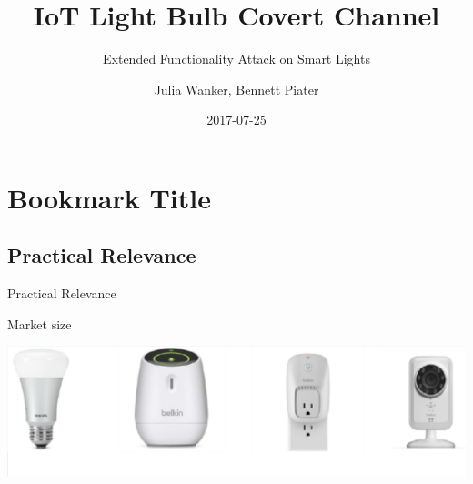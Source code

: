 \documentclass[11pt,t,usepdftitle=false,aspectratio=169]{beamer}
\title[IoT Light Bulb Attack]{IoT Light Bulb Covert Channel}
\subtitle{Extended Functionality Attack on Smart Lights}
\author[Julia Wanker \& Bennett Piater]{Julia Wanker, Bennett Piater}
\date{2017-07-25}
\begin{document}



\section{Bookmark Title}

\subsection{Practical Relevance}

\begin{frame}{Practical Relevance}
	\begin{block}{Market size}
	   \begin{center}
		    \includegraphics{img/MarketSize.png}
	   \end{center}
	\end{block}
\end{frame}
\end{document}
